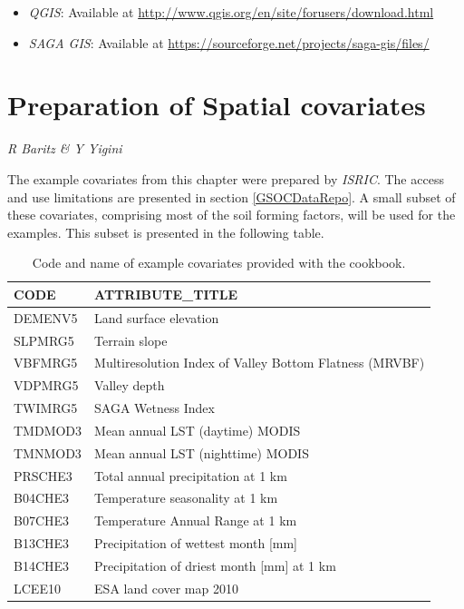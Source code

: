 \documentclass[10pt,b5paper,]{book}
\providecommand{\tightlist}{%
  \setlength{\itemsep}{0pt}\setlength{\parskip}{0pt}}
\theoremstyle{definition}
\theoremstyle{definition}
\theoremstyle{definition}
\theoremstyle{remark}
\begin{document}
\begin{itemize}
\tightlist
\item
  \emph{QGIS}: Available at
  \url{http://www.qgis.org/en/site/forusers/download.html}
\item
  \emph{SAGA GIS}: Available at
  \url{https://sourceforge.net/projects/saga-gis/files/}
\end{itemize}

\hypertarget{covariates}{%
\chapter{Preparation of Spatial covariates}\label{covariates}}

\emph{R Baritz \& Y Yigini}

The example covariates from this chapter were prepared by \emph{ISRIC}.
The access and use limitations are presented in section
\ref{GSOCDataRepo}. A small subset of these covariates, comprising most
of the soil forming factors, will be used for the examples. This subset
is presented in the following table.

\begin{table}

\caption{\label{tab:covariates}Code and name of example covariates provided with the cookbook.}
\centering
\begin{tabular}[t]{ll}
\toprule
CODE & ATTRIBUTE\_TITLE\\
\midrule
DEMENV5 & Land surface elevation\\
SLPMRG5 & Terrain slope\\
VBFMRG5 & Multiresolution Index of Valley Bottom Flatness (MRVBF)\\
VDPMRG5 & Valley depth\\
TWIMRG5 & SAGA Wetness Index\\
\addlinespace
TMDMOD3 & Mean annual LST (daytime) MODIS\\
TMNMOD3 & Mean annual LST (nighttime) MODIS\\
PRSCHE3 & Total annual precipitation at 1 km\\
B04CHE3 & Temperature seasonality at 1 km\\
B07CHE3 & Temperature Annual Range at 1 km\\
\addlinespace
B13CHE3 & Precipitation of wettest month [mm]\\
B14CHE3 & Precipitation of driest month [mm] at 1 km\\
LCEE10 & ESA land cover map 2010\\
\bottomrule
\end{tabular}
\end{table}
\end{document}
